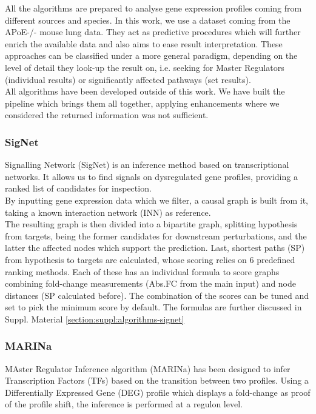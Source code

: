 All the algorithms are prepared to analyse gene expression profiles coming from different sources and species. In this work, we use a dataset coming from the APoE-/- \cite{LoSasso2016TheReduction} mouse lung data. They act as predictive procedures which will further enrich the available data and also aims to ease result interpretation. These approaches can be classified under a more general paradigm, depending on the  level of detail they look-up the result on, i.e. seeking for Master Regulators (individual results) or significantly affected pathways \cite{Faust2010PathwayExtraction} (set results).
\\

All algorithms have been developed outside of this work. We have built the pipeline which brings them all together, applying enhancements where we considered the returned information was not sufficient.
\\

\subsubsection{SigNet}
Signalling Network (SigNet) \cite{Coker2017SiGNet:Inference} is an inference method based on transcriptional networks. It allows us to find signals on dysregulated gene profiles, providing a ranked list of candidates for inspection. 
\\

By inputting gene expression data which we filter, a causal graph is built from it, taking a known interaction network (INN) as reference.
\\

The resulting graph is then divided into a bipartite graph, splitting hypothesis from targets, being the former candidates for downstream perturbations, and the latter the affected nodes which support the prediction. Last, shortest paths (SP) from hypothesis to targets are calculated, whose scoring relies on 6 predefined ranking methods. Each of these has an individual formula to score graphs combining fold-change measurements (Abs.FC from the main input) and node distances (SP calculated before). The combination of the scores can be tuned and set to pick the minimum score by default. The formulas are further discussed in Suppl. Material \ref{section:suppl:algorithms-signet}


\subsubsection{MARINa}
MAster Regulator Inference algorithm (MARINa) \cite{Lefebvre2010ACenters} has been designed to infer Transcription Factors (TFs) based on the transition between two profiles. Using a Differentially Expressed Gene (DEG) profile which displays a fold-change as proof of the profile shift, the inference is performed at a regulon level.
\\

